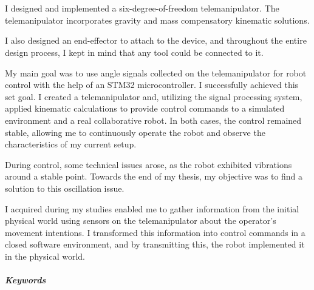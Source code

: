 \chapter*{\summary}

\selectforeignlanguage %

I designed and implemented a six-degree-of-freedom telemanipulator. The telemanipulator incorporates gravity and mass compensatory kinematic solutions.

I also designed an end-effector to attach to the device, and throughout the entire design process, I kept in mind that any tool could be connected to it.

My main goal was to use angle signals collected on the telemanipulator for robot control with the help of an STM32 microcontroller. I successfully achieved this set goal. I created a telemanipulator and, utilizing the signal processing system, applied kinematic calculations to provide control commands to a simulated environment and a real collaborative robot. In both cases, the control remained stable, allowing me to continuously operate the robot and observe the characteristics of my current setup.

During control, some technical issues arose, as the robot exhibited vibrations around a stable point. Towards the end of my thesis, my objective was to find a solution to this oscillation issue.

I acquired during my studies enabled me to gather information from the initial physical world using sensors on the telemanipulator about the operator's movement intentions. I transformed this information into control commands in a closed software environment, and by transmitting this, the robot implemented it in the physical world.

\vspace{0.5cm}
\paragraph{Keywords} \emph{\keywords}  %


\selectthesislanguage %
